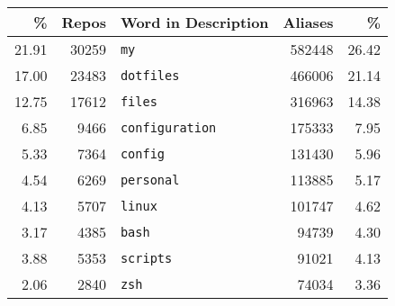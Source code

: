 \begin{tabular}{rrlrr}
\toprule
         \% &       Repos & Word in Description &      Aliases &          \% \\
\midrule
\num{21.91} & \num{30259} &              \texttt{my} & \num{582448} & \num{26.42} \\
\num{17.00} & \num{23483} &        \texttt{dotfiles} & \num{466006} & \num{21.14} \\
\num{12.75} & \num{17612} &           \texttt{files} & \num{316963} & \num{14.38} \\
 \num{6.85} &  \num{9466} &   \texttt{configuration} & \num{175333} &  \num{7.95} \\
 \num{5.33} &  \num{7364} &          \texttt{config} & \num{131430} &  \num{5.96} \\
 \num{4.54} &  \num{6269} &        \texttt{personal} & \num{113885} &  \num{5.17} \\
 \num{4.13} &  \num{5707} &           \texttt{linux} & \num{101747} &  \num{4.62} \\
 \num{3.17} &  \num{4385} &            \texttt{bash} &  \num{94739} &  \num{4.30} \\
 \num{3.88} &  \num{5353} &         \texttt{scripts} &  \num{91021} &  \num{4.13} \\
 \num{2.06} &  \num{2840} &             \texttt{zsh} &  \num{74034} &  \num{3.36} \\
\bottomrule
\end{tabular}